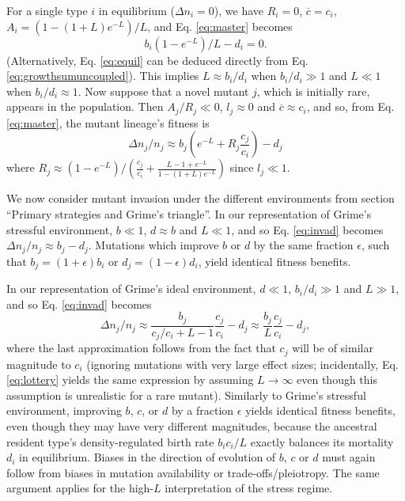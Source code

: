 \documentclass[11pt]{article}
\begin{document}
For a single type $i$ in equilibrium ($\Delta n_i = 0$), we have $R_i=0$, $\overline{c}=c_i$, $A_i=(1-(1+L)e^{-L})/L$, and Eq. \eqref{eq:master} becomes
\begin{equation}
b_i(1-e^{-L})/L-d_i=0.\label{eq:equil}
\end{equation}
(Alternatively, Eq. \eqref{eq:equil} can be deduced directly from Eq. \eqref{eq:growthsumuncoupled}). This implies $L\approx b_i/d_i$ when $b_i/d_i\gg 1$ and $L\ll 1$ when $b_i/d_i\approx 1$. Now suppose that a novel mutant $j$, which is initially rare, appears in the population. Then $A_j/R_j\ll 0$, $l_j\approx 0$ and $\overline{c}\approx c_i$, and so, from Eq. \eqref{eq:master}, the mutant lineage's fitness is
\begin{equation}
\Delta n_j/n_j \approx b_j \left(e^{-L}+R_j\frac{c_j}{c_i}\right)-d_j \label{eq:invad}
\end{equation}
where $R_j\approx (1-e^{-L})/\left(\frac{c_j}{c_i}+\frac{L-1+e^{-L}}{1-(1+L)e^{-L}}\right)$ since $l_j\ll 1$.

We now consider mutant invasion under the different environments from section ``Primary strategies and Grime's triangle''. In our representation of Grime's stressful environment, $b\ll 1$, $d\approx b$ and $L\ll 1$, and so Eq. \eqref{eq:invad} becomes $\Delta n_j/n_j \approx b_j-d_j$. Mutations which improve $b$ or $d$ by the same fraction $\epsilon$, such that $b_j = (1+ \epsilon)b_i$ or $d_j = (1- \epsilon)d_i$,  yield identical fitness benefits. 

In our representation of Grime's ideal environment, $d\ll 1$, $b_i/d_i \gg 1$ and $L\gg 1$, and so Eq. \eqref{eq:invad} becomes 
\begin{equation}
\Delta n_j/n_j \approx \frac{b_j}{c_j/c_i + L-1}\frac{c_j}{c_i}-d_j\approx \frac{b_j}{L}\frac{c_j}{c_i}-d_j, \label{eq:highLinvad}
\end{equation}
where the last approximation follows from the fact that $c_j$ will be of similar magnitude to $c_i$ (ignoring mutations with very large effect sizes; incidentally, Eq. \eqref{eq:lottery} yields the same expression by assuming $L\rightarrow \infty$ even though this assumption is unrealistic for a rare mutant). Similarly to Grime's stressful environment, improving $b$, $c$, or $d$ by a fraction $\epsilon$ yields identical fitness benefits, even though they may have very different magnitudes, because the ancestral resident type's density-regulated birth rate $b_i c_i/L$ exactly balances its mortality $d_i$ in equilibrium. Biases in the direction of evolution of $b$, $c$ or $d$ must again follow from biases in mutation availability or trade-offs/pleiotropy. The same argument applies for the high-$L$ interpretation of the stress regime. 
\end{document}
